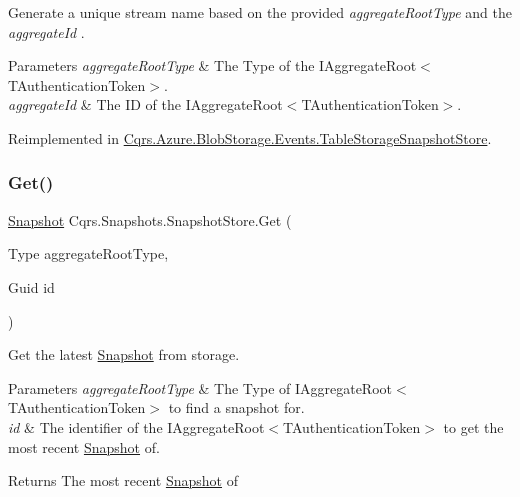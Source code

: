 Generate a unique stream name based on the provided {\itshape aggregate\+Root\+Type}  and the {\itshape aggregate\+Id} . 


\begin{DoxyParams}{Parameters}
{\em aggregate\+Root\+Type} & The Type of the I\+Aggregate\+Root$<$\+T\+Authentication\+Token$>$.\\
\hline
{\em aggregate\+Id} & The ID of the I\+Aggregate\+Root$<$\+T\+Authentication\+Token$>$.\\
\hline
\end{DoxyParams}


Reimplemented in \hyperlink{classCqrs_1_1Azure_1_1BlobStorage_1_1Events_1_1TableStorageSnapshotStore_a95503a8721d083d070495cb4f884c0cf_a95503a8721d083d070495cb4f884c0cf}{Cqrs.\+Azure.\+Blob\+Storage.\+Events.\+Table\+Storage\+Snapshot\+Store}.

\mbox{\label{classCqrs_1_1Snapshots_1_1SnapshotStore_a08ec0d8ff97742e3503a3778bb92076e_a08ec0d8ff97742e3503a3778bb92076e}} 
\subsubsection{\texorpdfstring{Get()}{Get()}\hspace{0.1cm}{\footnotesize\ttfamily [1/2]}}
{\footnotesize\ttfamily \hyperlink{classCqrs_1_1Snapshots_1_1Snapshot}{Snapshot} Cqrs.\+Snapshots.\+Snapshot\+Store.\+Get (\begin{DoxyParamCaption}\item[{Type}]{aggregate\+Root\+Type,  }\item[{Guid}]{id }\end{DoxyParamCaption})}



Get the latest \hyperlink{classCqrs_1_1Snapshots_1_1Snapshot}{Snapshot} from storage. 


\begin{DoxyParams}{Parameters}
{\em aggregate\+Root\+Type} & The Type of I\+Aggregate\+Root$<$\+T\+Authentication\+Token$>$ to find a snapshot for.\\
\hline
{\em id} & The identifier of the I\+Aggregate\+Root$<$\+T\+Authentication\+Token$>$ to get the most recent \hyperlink{classCqrs_1_1Snapshots_1_1Snapshot}{Snapshot} of.\\
\hline
\end{DoxyParams}
\begin{DoxyReturn}{Returns}
The most recent \hyperlink{classCqrs_1_1Snapshots_1_1Snapshot}{Snapshot} of
\end{DoxyReturn}


